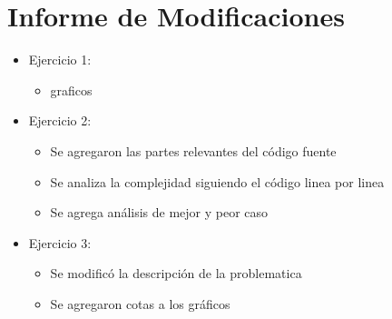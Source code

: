 \section{Informe de Modificaciones}

\begin{itemize}

	\item Ejercicio 1:
	\begin{itemize}
		\item graficos
	\end{itemize}
	
	\item Ejercicio 2:
	\begin{itemize}
		\item Se agregaron las partes relevantes del código fuente
		\item Se analiza la complejidad siguiendo el código linea por linea
		\item Se agrega análisis de mejor y peor caso
	\end{itemize}
	
	\item Ejercicio 3:
	\begin{itemize}
		\item Se modificó la descripción de la problematica
		\item Se agregaron cotas a los gráficos
	\end{itemize}
\end{itemize}